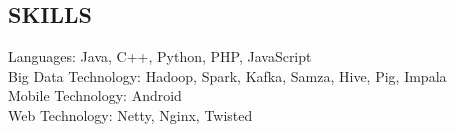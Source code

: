 \documentclass[mm, 7pt]{resume} %
\begin{document}
\begin{resume}
\section{SKILLS}

Languages:             \hfill  Java, C++, Python, PHP, JavaScript  \\
Big Data Technology:   \hfill Hadoop, Spark, Kafka, Samza, Hive, Pig, Impala \\
Mobile Technology:    \hfill  Android \\
Web Technology:       \hfill  Netty, Nginx, Twisted \\

\end{resume}
\end{document}
